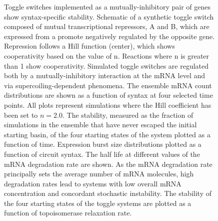 \documentclass[11pt]{article}
\begin{document}
\begin{figure}[htbp]
    \ContinuedFloat
    \caption{Toggle switches implemented as a mutually-inhibitory pair of genes show syntax-specific stability. 
     Schematic of a synthetic toggle switch composed of mutual transcriptional repressors, A and B, which are expressed from a promote negatively regulated by the opposite gene. Repression follows a Hill function (center), which shows cooperativity based on the value of n. Reactions where n is greater than 1 show cooperativity. Simulated toggle switches are regulated both by a mutually-inhibitory interaction at the mRNA level and via supercoiling-dependent phenomena.
     The ensemble mRNA count distributions are shown as a function of syntax at four selected time points.   All plots represent simulations where the Hill coefficient has been set to \(n = 2.0\).
     The stability, measured as the fraction of simulations in the ensemble that have never escaped the initial starting basin, of the four starting states of the system plotted as a function of time. 
     Expression burst size distributions plotted as a function of circuit syntax. 
     The half life at different values of the mRNA degradation rate are shown. As the mRNA degradation rate principally sets the average number of mRNA molecules, high degradation rates lead to systems with low overall mRNA concentration and concordant stochastic instability.
     The stability of the four starting states of the toggle systems are plotted as a function of topoisomerase relaxation rate. 
} \label{fig:top:toggle_switch}
\end{figure}



\FloatBarrier
\end{document}
